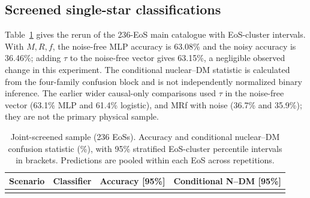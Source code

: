 \documentclass[11pt,a4paper]{article}
\begin{document}
\subsection{Screened single-star classifications}
Table~\ref{tab:ml} gives the rerun of the 236-EoS main catalogue with EoS-cluster intervals. With $M,R,f$, the noise-free MLP accuracy is 63.08\% and the noisy accuracy is 36.46\%; adding $\tau$ to the noise-free vector gives 63.15\%, a negligible observed change in this experiment. The conditional nuclear--DM statistic is calculated from the four-family confusion block and is not independently normalized binary inference. The earlier wider causal-only comparisons used $\tau$ in the noise-free vector (63.1\% MLP and 61.4\% logistic), and MRf with noise (36.7\% and 35.9\%); they are not the primary physical sample.
\begin{table}[htbp]\centering\small
\caption{Joint-screened sample (236 EoSs). Accuracy and conditional nuclear--DM confusion statistic (\%), with 95\% stratified EoS-cluster percentile intervals in brackets. Predictions are pooled within each EoS across repetitions.}\label{tab:ml}
\begin{tabular}{llrr}\toprule
Scenario & Classifier & Accuracy [95\%] & Conditional N--DM [95\%]\\\midrule
\\\bottomrule
\end{tabular}\end{table}
\end{document}

